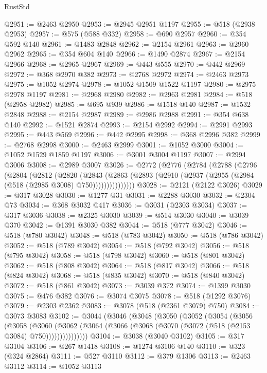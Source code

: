 \begin{lexlean}{RustStd}
\begin{coremodule}
{\begin{coremodule}
{{{{{{{{{{{{{{{{{{{{{{{{{{{{{{{{{{{{{{{{{{{{{{{{{{@2951 := @2463 @2950
@2953 := @2945 @2951 @1197
@2955 := @518 (@2938 @2953)
@2957 := @575 (@588 @332)
@2958 := @690 @2957
@2960 := @354 @592 @140
@2961 := @1483 @2848
@2962 := @2154 @2961
@2963 := @2960 @2962
@2965 := @354 @604 @140
@2966 := @1490 @2874
@2967 := @2154 @2966
@2968 := @2965 @2967
@2969 := @443 @555
@2970 := @442 @2969
@2972 := @368 @2970 @382
@2973 := @2768 @2972
@2974 := @2463 @2973
@2975 := @1052 @2974
@2978 := @1052 @1509 @1522 @1197
@2980 := @2975 @2978 @1197
@2981 := @2968 @2980
@2982 := @2963 @2981
@2984 := @518 (@2958 @2982)
@2985 := @695 @939
@2986 := @1518 @140
@2987 := @1532 @2848
@2988 := @2154 @2987
@2989 := @2986 @2988
@2991 := @354 @638 @140
@2992 := @1521 @2874
@2993 := @2154 @2992
@2994 := @2991 @2993
@2995 := @443 @569
@2996 := @442 @2995
@2998 := @368 @2996 @382
@2999 := @2768 @2998
@3000 := @2463 @2999
@3001 := @1052 @3000
@3004 := @1052 @1529 @1859 @1197
@3006 := @3001 @3004 @1197
@3007 := @2994 @3006
@3008 := @2989 @3007
@3026 := @2772
    (@2776
      (@2784
        (@2788
          (@2796
            (@2804
              (@2812
                (@2820
                  (@2843
                    (@2863
                      (@2893 (@2910 (@2937 (@2955 (@2984 (@518 (@2985 @3008) @750)))))))))))))))
@3028 := @2121 (@2122 @3026)
@3029 := @317 @3028
@3030 := @1277 @31
@3031 := @2288 @3030
@3032 := @2304 @73
@3034 := @368 @3032 @417
@3036 := @3031 (@2303 @3034)
@3037 := @317 @3036
@3038 := @2325 @3030
@3039 := @514 @3030
@3040 := @3039 @370
@3042 := @1391 @3030 @382
@3044 := @518 (@777 @3042)
@3046 := @518 (@780 @3042)
@3048 := @518 (@783 @3042)
@3050 := @518 (@786 @3042)
@3052 := @518 (@789 @3042)
@3054 := @518 (@792 @3042)
@3056 := @518 (@795 @3042)
@3058 := @518 (@798 @3042)
@3060 := @518 (@801 @3042)
@3062 := @518 (@808 @3042)
@3064 := @518 (@817 @3042)
@3066 := @518 (@824 @3042)
@3068 := @518 (@835 @3042)
@3070 := @518 (@840 @3042)
@3072 := @518 (@861 @3042)
@3073 := @3039 @372
@3074 := @1399 @3030
@3075 := @476 @382
@3076 := @3074 @3075
@3078 := @518 (@1292 @3076)
@3079 := @2303 @2362
@3083 := @3078 (@518 (@2361 @3079) @750)
@3084 := @3073 @3083
@3102 := @3044
    (@3046
      (@3048
        (@3050
          (@3052
            (@3054
              (@3056
                (@3058
                  (@3060
                    (@3062
                      (@3064 (@3066 (@3068 (@3070 (@3072 (@518 (@2153 @3084) @750)))))))))))))))
@3104 := @3038 (@3040 @3102)
@3105 := @317 @3104
@3106 := @267 @1418
@3108 := @1274 @3106 @140
@3110 := @323 (@324 @2864)
@3111 := @527 @3110
@3112 := @379 @1306
@3113 := @2463 @3112
@3114 := @1052 @3113
}}}}}}}}}}}}}}}}}}}}}}}}}}}}}}}}}}}}}}}}}}}}}}}}}}
\end{coremodule}}
\end{coremodule}
\end{lexlean}
